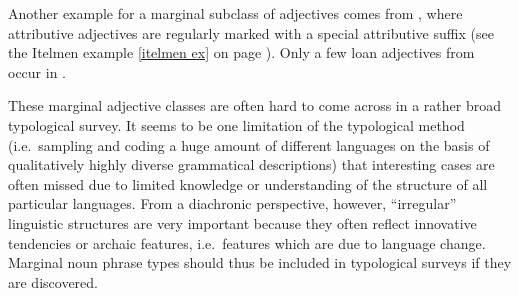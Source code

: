Another example for a marginal subclass of adjectives comes from , where attributive adjectives are regularly marked with a special attributive suffix (see the Itelmen example \ref{itelmen ex} on page \pageref{itelmen synchr}). Only a few loan adjectives from  occur in  \citep[60–71]{volodin1997}.

These marginal adjective classes are often hard to come across in a rather broad typological survey. It seems to be one limitation of the typological method (i.e.~sampling and coding a huge amount of different languages on the basis of qualitatively highly diverse grammatical descriptions) that interesting cases are often missed due to limited knowledge or understanding of the structure of all particular languages. From a diachronic perspective, however, “irregular” linguistic structures are very important because they often reflect innovative tendencies or archaic features, i.e.~features which are due to language change. Marginal noun phrase types should thus be included in typological surveys if they are discovered.

